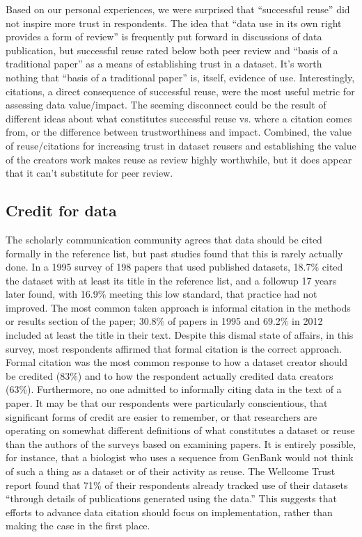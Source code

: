 \documentclass[10pt]{article}
\begin{document}
Based on our personal experiences, we were surprised that ``successful reuse'' did not inspire more trust in respondents.
The idea that ``data use in its own right provides a form of review''\cite{parsons_data_2010} is frequently put forward in discussions of data publication, but successful reuse rated below both peer review and ``basis of a traditional paper'' as a means of establishing trust in a dataset.
It's worth nothing that ``basis of a traditional paper'' is, itself, evidence of use.
Interestingly, citations, a direct consequence of successful reuse, were the most useful metric for assessing data value/impact.
The seeming disconnect could be the result of different ideas about what constitutes successful reuse vs. where a citation comes from, or the difference between trustworthiness and impact.
Combined, the value of reuse/citations for increasing trust in dataset reusers and establishing the value of the creators work makes reuse as review highly worthwhile, but it does appear that it can't substitute for peer review.

\subsection*{Credit for data}

The scholarly communication community agrees that data should be cited formally in the reference list,\cite{force11_data_citation_synthesis_group_joint_2014} but past studies found that this is rarely actually done.\cite{sieber_not_1995, mooney_citing_2011, mooney_anatomy_2012}
In a 1995 survey of 198 papers that used published datasets, 18.7\% cited the dataset with at least its title in the reference list\cite{sieber_not_1995}, and a followup 17 years later found, with 16.9\% meeting this low standard, that practice had not improved.\cite{mooney_anatomy_2012}
The most common taken approach is informal citation in the methods or results section of the paper; 30.8\% of papers in 1995 and 69.2\% in 2012 included at least the title in their text.
Despite this dismal state of affairs, in this survey, most respondents affirmed that formal citation is the correct approach.
Formal citation was the most common response to how a dataset creator should be credited (83\%) and to how the respondent actually credited data creators (63\%).
Furthermore, no one admitted to informally citing data in the text of a paper.
It may be that our respondents were particularly conscientious, that significant forms of credit are easier to remember, or that researchers are operating on somewhat different definitions of what constitutes a dataset or reuse than the authors of the surveys based on examining papers.
It is entirely possible, for instance, that a biologist who uses a sequence from GenBank would not think of such a thing as a dataset or of their activity as reuse.
The Wellcome Trust report found that 71\% of their respondents already tracked use of their datasets ``through details of publications generated using the data.''\cite{bobrow_establishing_2014} 
This suggests that efforts to advance data citation should focus on implementation, rather than making the case in the first place.
\end{document}
